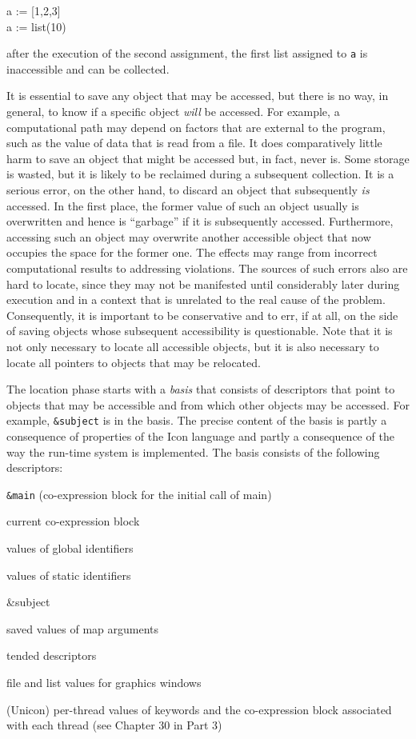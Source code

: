 \begin{iconcode}
\>a := [1,2,3]\\
\>a := list(10)
\end{iconcode}

\noindent after the execution of the second assignment, the first list
assigned to \texttt{a} is inaccessible and can be collected.

It is essential to save any object that may be accessed, but there is
no way, in general, to know if a specific object \textit{will} be
accessed. For example, a computational path may depend on factors that
are external to the program, such as the value of data that is read
from a file. It does comparatively little harm to save an object that
might be accessed but, in fact, never is. Some storage is wasted, but
it is likely to be reclaimed during a subsequent collection. It is a
serious error, on the other hand, to discard an object that
subsequently \textit{is} accessed. In the first place, the former
value of such an object usually is overwritten and hence is
``garbage'' if it is subsequently accessed. Furthermore, accessing
such an object may overwrite another accessible object that now
occupies the space for the former one. The effects may range from
incorrect computational results to addressing violations. The sources
of such errors also are hard to locate, since they may not be
manifested until considerably later during execution and in a context
that is unrelated to the real cause of the problem. Consequently, it
is important to be conservative and to err, if at all, on the side of
saving objects whose subsequent accessibility is questionable. Note
that it is not only necessary to locate all accessible objects, but it
is also necessary to locate all pointers to objects that may be
relocated.

The location phase starts with a \textit{basis} that consists of
descriptors that point to objects that may be accessible and from
which other objects may be accessed. For example, \texttt{\&subject}
is in the basis. The precise content of the basis is partly a
consequence of properties of the Icon language and partly a
consequence of the way the run-time system is implemented. The basis
consists of the following descriptors:

\liststyleLxiii
\begin{itemize}
\item 
\texttt{\&main} (co-expression block for the initial call of main)
\item 
current co-expression block
\item 
values of global identifiers
\item 
values of static identifiers
\item {\ttfamily
\&subject}
\item 
saved values of map arguments
\item 
tended descriptors
\item
file and list values for graphics windows
{\color{blue}
\item
(Unicon) per-thread values of keywords and the co-expression block
associated with each thread (see Chapter 30 in Part 3) }
\end{itemize}

